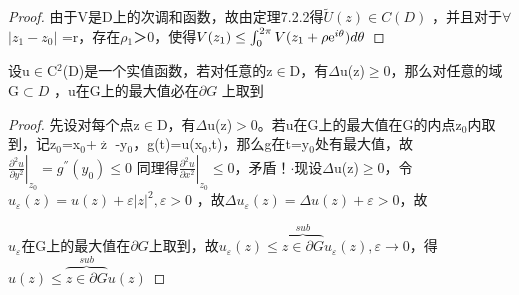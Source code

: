    \begin{proof}
  由于V是D上的次调和函数，故由定理7.2.2得$\widetilde U(z) \in C(D)$
，并且对于$\forall{}$$\left| {{z_1} - {z_0}} \right|$
=r，存在$\rho{}$$_{1}$＞0，使得$V({z_1}) \le \int_0^{2\pi } {V({z_1} + \rho
{{\rm{e}}^{i\theta }})d\theta }$

    \end{proof}

\begin{theorem}
设u$\in{}$C$^{2}$(D)是一个实值函数，若对任意的z$\in{}$D，有$\Delta{}$u(z)$\geq{}$0，那么对任意的域G$
\subset D$ ，u在G上的最大值必在$\partial G$ 上取到
\end{theorem}

\begin{proof}
先设对每个点z$\in{}$D，有$\Delta{}$u(z)$>$0。若u在G上的最大值在G的内点z$_{0}$内取到，记z$_{0}$=x$_{0}$+$\mathop
z\limits^. $ -y$_{0}$，g(t)=u(x$_{0}$,t)，那么g在t=y$_{0}$处有最大值，故${\left.
{\frac{{{\partial ^2}u}}{{\partial {y^2}}}} \right|_{{z_0}}} = {g^{''}}({y_0})
\le 0$ 同理得${\left. {\frac{{{\partial ^2}u}}{{\partial {x^2}}}} \right|_{{z_0}}}
\le 0$，矛盾！\hspace{15pt}$\cdot{}$现设$\Delta{}$u(z)$\geq{}$0，令${u_\varepsilon }(z) =
u(z) + \varepsilon {\left| z \right|^2},\varepsilon  > 0$ ，故$\Delta
{u_\varepsilon }(z) = \Delta u(z) + \varepsilon  > 0$，故

${u_\varepsilon }${\large 在G上的最大值在$\partial G$上取到，故${u_\varepsilon }(z) \le
\overbrace {z \in \partial G}^{sub}{u_\varepsilon }(z),\varepsilon  \to 0$，得$u(z)
\le \overbrace {z \in \partial G}^{sub}u(z)$}
    \end{proof}


